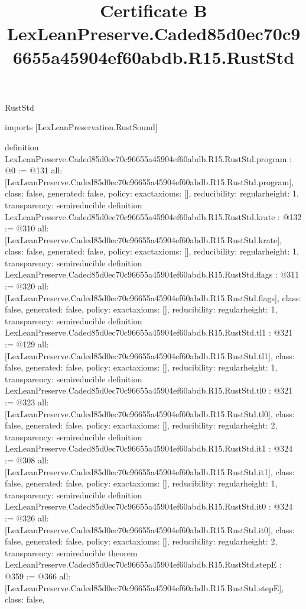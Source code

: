 \begin{lexlean}{RustStd}
\title{Certificate B LexLeanPreserve.Caded85d0ec70c96655a45904ef60abdb.R15.RustStd}
\begin{coremodule}
imports [LexLeanPreservation.RustSound]

definition LexLeanPreserve.Caded85d0ec70c96655a45904ef60abdb.R15.RustStd.program : @0 := @131 {
  all: [LexLeanPreserve.Caded85d0ec70c96655a45904ef60abdb.R15.RustStd.program],
  class: false,
  generated: false,
  policy: exact{axioms: []},
  reducibility: regular{height: 1},
  transparency: semireducible
}
definition LexLeanPreserve.Caded85d0ec70c96655a45904ef60abdb.R15.RustStd.krate : @132 := @310 {
  all: [LexLeanPreserve.Caded85d0ec70c96655a45904ef60abdb.R15.RustStd.krate],
  class: false,
  generated: false,
  policy: exact{axioms: []},
  reducibility: regular{height: 1},
  transparency: semireducible
}
definition LexLeanPreserve.Caded85d0ec70c96655a45904ef60abdb.R15.RustStd.flags : @311 := @320 {
  all: [LexLeanPreserve.Caded85d0ec70c96655a45904ef60abdb.R15.RustStd.flags],
  class: false,
  generated: false,
  policy: exact{axioms: []},
  reducibility: regular{height: 1},
  transparency: semireducible
}
definition LexLeanPreserve.Caded85d0ec70c96655a45904ef60abdb.R15.RustStd.tl1 : @321 := @129 {
  all: [LexLeanPreserve.Caded85d0ec70c96655a45904ef60abdb.R15.RustStd.tl1],
  class: false,
  generated: false,
  policy: exact{axioms: []},
  reducibility: regular{height: 1},
  transparency: semireducible
}
definition LexLeanPreserve.Caded85d0ec70c96655a45904ef60abdb.R15.RustStd.tl0 : @321 := @323 {
  all: [LexLeanPreserve.Caded85d0ec70c96655a45904ef60abdb.R15.RustStd.tl0],
  class: false,
  generated: false,
  policy: exact{axioms: []},
  reducibility: regular{height: 2},
  transparency: semireducible
}
definition LexLeanPreserve.Caded85d0ec70c96655a45904ef60abdb.R15.RustStd.it1 : @324 := @308 {
  all: [LexLeanPreserve.Caded85d0ec70c96655a45904ef60abdb.R15.RustStd.it1],
  class: false,
  generated: false,
  policy: exact{axioms: []},
  reducibility: regular{height: 1},
  transparency: semireducible
}
definition LexLeanPreserve.Caded85d0ec70c96655a45904ef60abdb.R15.RustStd.it0 : @324 := @326 {
  all: [LexLeanPreserve.Caded85d0ec70c96655a45904ef60abdb.R15.RustStd.it0],
  class: false,
  generated: false,
  policy: exact{axioms: []},
  reducibility: regular{height: 2},
  transparency: semireducible
}
theorem LexLeanPreserve.Caded85d0ec70c96655a45904ef60abdb.R15.RustStd.stepE : @359 := @366 {
  all: [LexLeanPreserve.Caded85d0ec70c96655a45904ef60abdb.R15.RustStd.stepE],
  class: false,
}
\end{coremodule}
\end{lexlean}
